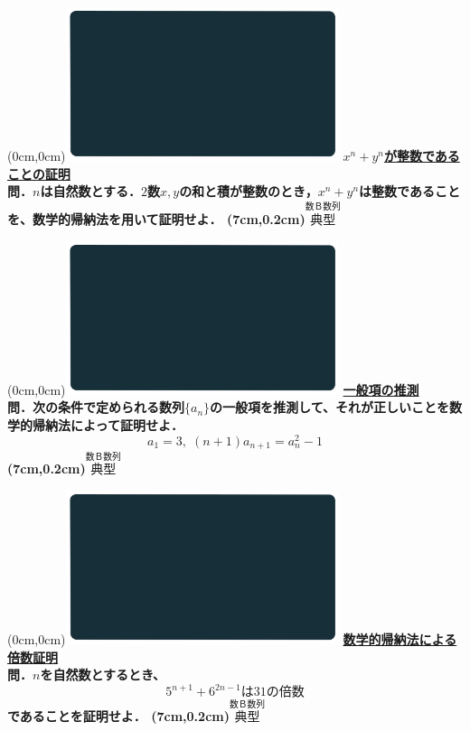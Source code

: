 \documentclass[10pt,
fleqn,
dvipdfmx,
uplatex
]{jsarticle}
\begin{document}
\newpage

\at(0cm,0cm){\includegraphics[width=8cm,bb=0 0 1920 1080]{./youtube/thumbnails/templates/smart_background/数B数列.jpeg}}
{\color{orange}\bf\boldmath\large\underline{$x^n+y^n$が整数であることの証明}}\vspace{0.3zw}\\
\Large 
\bf\boldmath 問．$n$は自然数とする．$2$数$x,y$の和と積が整数のとき，$x^n+y^n$は整数であることを、数学的帰納法を用いて証明せよ．
\at(7cm,0.2cm){\small\color{bradorange}$\overset{\text{数Ｂ数列}}{\text{典型}}$}

\newpage

\at(0cm,0cm){\includegraphics[width=8cm,bb=0 0 1920 1080]{./youtube/thumbnails/templates/smart_background/数B数列.jpeg}}
{\color{orange}\bf\boldmath\Large\underline{一般項の推測}}\vspace{0.3zw}\\
\large 
\bf\boldmath 問．次の条件で定められる数列$\{a_n\}$の一般項を推測して、それが正しいことを数学的帰納法によって証明せよ．
\[a_1=3,\;\left(n+1\right)a_{n+1}=a_n^2-1\]
\at(7cm,0.2cm){\small\color{bradorange}$\overset{\text{数Ｂ数列}}{\text{典型}}$}

\newpage

\at(0cm,0cm){\includegraphics[width=8cm,bb=0 0 1920 1080]{./youtube/thumbnails/templates/smart_background/数B数列.jpeg}}
{\color{orange}\bf\boldmath\Large\underline{数学的帰納法による倍数証明}}\vspace{0.3zw}\\
\Large 
\bf\boldmath 問．$n$を自然数とするとき、
\[5^{n+1}+6^{2n-1}は{31}の倍数\]
であることを証明せよ．
\at(7cm,0.2cm){\small\color{bradorange}$\overset{\text{数Ｂ数列}}{\text{典型}}$}
\end{document}
